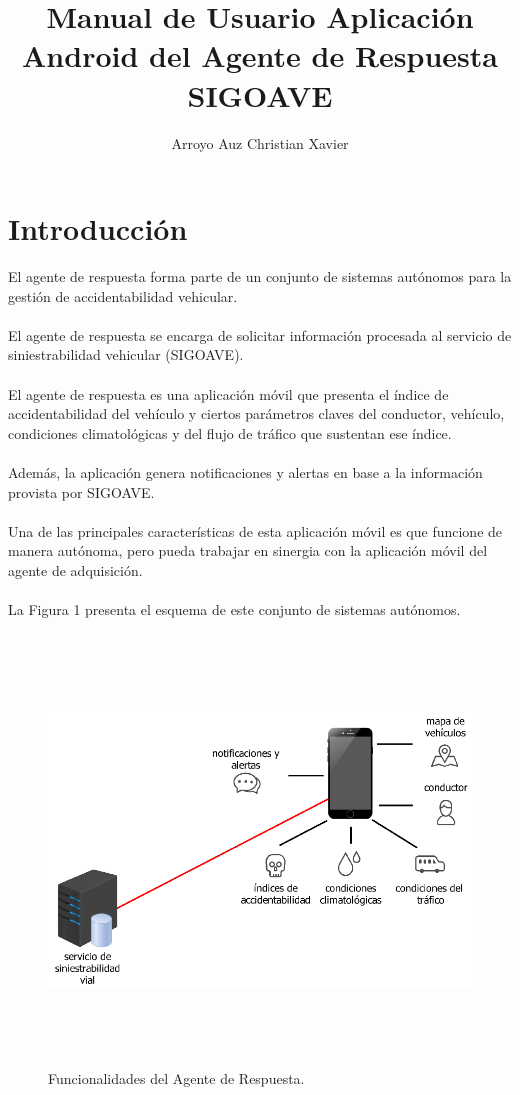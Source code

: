 \documentclass[a4paper,10pt, oneside, titlepage]{article}
\title{Manual de Usuario Aplicación Android del Agente de Respuesta SIGOAVE}
\author{Arroyo Auz Christian Xavier}
\begin{document}
	\maketitle
	\section{Introducción}
	El agente de respuesta forma parte de un conjunto de sistemas autónomos para la gestión de accidentabilidad vehicular.\\\\
	El agente de respuesta se encarga de solicitar información procesada al servicio de siniestrabilidad vehicular (SIGOAVE).\\\\
	El agente de respuesta es una aplicación móvil que presenta el índice de accidentabilidad del vehículo y ciertos parámetros claves del conductor, vehículo, condiciones climatológicas y del flujo de tráfico que sustentan ese índice.\\\\
	Además, la aplicación genera notificaciones y alertas en base a la información provista por SIGOAVE.\\\\
	Una de las principales características de esta aplicación móvil es que funcione de manera autónoma, pero pueda trabajar en sinergia con la aplicación móvil del agente de adquisición.\\\\
	La Figura 1 presenta el esquema de este conjunto de sistemas autónomos.
	\begin{figure}[!h]
		\centering
		\includegraphics[width = 1\linewidth, height = 11.4cm]{1.png}
		\caption{Funcionalidades del Agente de Respuesta.}
	\end{figure}
	
\end{document}
